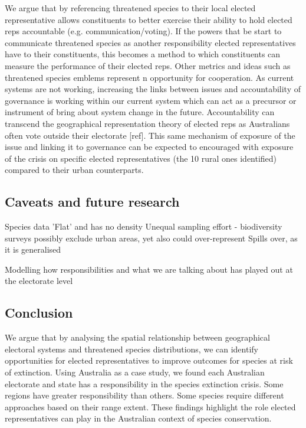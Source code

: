 \documentclass[a4paper,11pt]{article}
\begin{document}
We argue that by referencing threatened species to their local elected representative allows constituents to better exercise their ability to hold elected reps accountable (e.g. communication/voting). If the powers that be start to communicate threatened species as another responsibility elected representatives have to their constituents, this becomes a method to which constituents can measure the performance of their elected reps. Other metrics and ideas such as threatened species emblems represent n opportunity for cooperation.
As current systems are not working, increasing the links between issues and accountability of governance is working within our current system which can act as a precursor or instrument of bring about system change in the future.
Accountability can transcend the geographical representation theory of elected reps as Australians often vote outside their electorate [ref].
This same mechanism of exposure of the issue and linking it to governance can be expected to encouraged with exposure of the crisis on specific elected representatives (the 10 rural ones identified) compared to their urban counterparts.

\subsection{Caveats and future research}

Species data
'Flat' and has no density
Unequal sampling effort - biodiversity surveys possibly exclude urban areas, yet also could over-represent
Spills over, as it is generalised

Modelling how responsibilities and what we are talking about has played out at the electorate level


\subsection{Conclusion}

We argue that by analysing the spatial relationship between geographical electoral systems and threatened species distributions, we can identify opportunities for elected representatives to improve outcomes for species at risk of extinction. Using Australia as a case study, we found each Australian electorate and state has a responsibility in the species extinction crisis. Some regions have greater responsibility than others. Some species require different approaches based on their range extent. These findings highlight the role elected representatives can play in the Australian context of species conservation.
\end{document}
